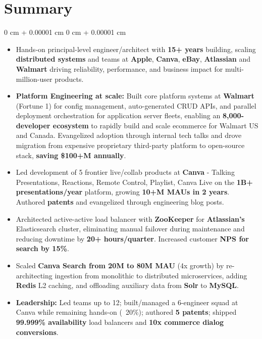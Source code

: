 \documentclass[10pt, letterpaper]{article}
\newenvironment{highlights}{
    \begin{itemize}[
        topsep=0.10 cm,
        parsep=0.10 cm,
        partopsep=0pt,
        itemsep=0pt,
        leftmargin=0 cm + 10pt
    ]
}{
    \end{itemize}
} %
\newenvironment{onecolentry}{
    \begin{adjustwidth}{
        0 cm + 0.00001 cm
    }{
        0 cm + 0.00001 cm
    }
}{
    \end{adjustwidth}
} %
\begin{document}
    \vspace{5 pt - 0.3 cm}

    \section{Summary}
    \begin{onecolentry}
        \begin{highlights}
            \item Hands-on principal-level engineer/architect with \textbf{15+ years} building, scaling \textbf{distributed systems} and teams at \textbf{Apple}, \textbf{Canva}, \textbf{eBay}, \textbf{Atlassian} and \textbf{Walmart} driving reliability, performance, and business impact for multi-million-user products.

            \item \textbf{Platform Engineering at scale:} Built core platform systems at \textbf{Walmart} (Fortune 1) for config management, auto-generated CRUD APIs, and parallel deployment orchestration for application server fleets, enabling an \textbf{8,000-developer ecosystem} to rapidly build and scale ecommerce for Walmart US and Canada. Evangelized adoption through internal tech talks and drove migration from expensive proprietary third-party platform to open-source stack, \textbf{saving \$100+M annually}.

            \item Led development of 5 frontier live/collab products at \textbf{Canva} - Talking Presentations, Reactions, Remote Control, Playlist, Canva Live on the \textbf{1B+ presentations/year} platform, growing \textbf{10+M MAUs in 2 years}. Authored \textbf{patents} and evangelized through engineering blog posts.
            
            \item Architected active-active load balancer with \textbf{ZooKeeper} for \textbf{Atlassian's} Elasticsearch cluster, eliminating manual failover during maintenance and reducing downtime by \textbf{20+ hours/quarter}. Increased customer \textbf{NPS for search by 15\%}.
            
            \item Scaled \textbf{Canva Search from 20M to 80M MAU} (4x growth) by re-architecting ingestion from monolithic to distributed microservices, adding \textbf{Redis} L2 caching, and offloading auxiliary data from \textbf{Solr} to \textbf{MySQL}.
            
            \item \textbf{Leadership:} Led teams up to 12; built/managed a 6-engineer squad at Canva while remaining hands-on (~20\%); authored \textbf{5 patents}; shipped \textbf{99.999\% availability} load balancers and \textbf{10x commerce dialog conversions}.


\end{highlights}
\end{onecolentry}
\end{document}
